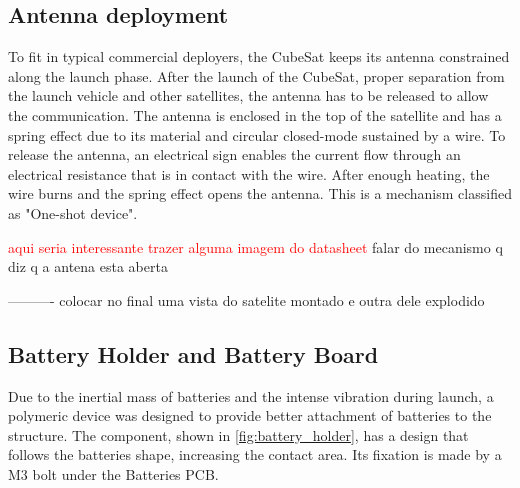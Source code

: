 

\subsection{Antenna deployment}

To fit in typical commercial deployers, the CubeSat keeps its antenna constrained along the launch phase.
After the launch of the CubeSat, proper separation from the launch vehicle and other satellites, the antenna has to be released to allow the communication. The antenna is enclosed in the top of the satellite and has a spring effect due to its material and circular closed-mode sustained by a wire. To release the antenna, an electrical sign enables the current flow through an electrical resistance that is in contact with the wire. After enough heating, the wire burns and the spring effect opens the antenna. This is a mechanism classified as "One-shot device".

\textcolor{red}{aqui seria interessante trazer alguma imagem do datasheet}
falar do mecanismo q diz q a antena esta aberta


----------
colocar no final uma vista do satelite montado e outra dele explodido


\subsection{Battery Holder and Battery Board}
Due to the inertial mass of batteries and the intense vibration during launch, a polymeric device was designed to provide better attachment of batteries to the structure. The component, shown in \autoref{fig:battery_holder}, has a design that follows the batteries shape, increasing the contact area. Its fixation is made by a M3 bolt under the Batteries PCB.


